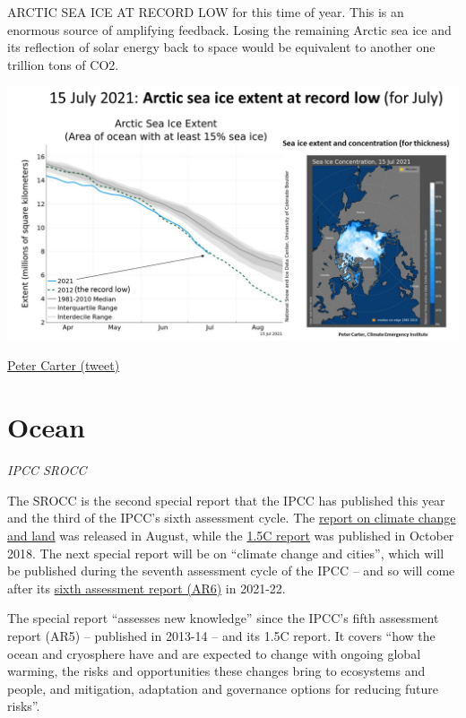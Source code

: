 \documentclass[
]{book}
\begin{document}
ARCTIC SEA ICE AT RECORD LOW for this time of year. This is an enormous source of amplifying feedback. Losing the remaining Arctic sea ice and its reflection of solar energy back to space would be equivalent to another one trillion tons of CO2.

\includegraphics{fig/Arctic_Sea_Ice_2107715.jpeg}

\href{https://twitter.com/PCarterClimate/status/1416264975522295809/photo/1}{Peter Carter (tweet)}

\hypertarget{ocean}{%
\chapter{Ocean}\label{ocean}}

\emph{IPCC SROCC}

The SROCC is the second special report that the IPCC has published this year and the third of the IPCC's sixth assessment cycle. The \href{https://www.carbonbrief.org/in-depth-qa-the-ipccs-special-report-on-climate-change-and-land}{report on climate change and land} was released in August, while the \href{https://www.carbonbrief.org/in-depth-qa-ipccs-special-report-on-climate-change-at-one-point-five-c}{1.5C report} was published in October 2018. The next special report will be on ``climate change and cities'', which will be published during the seventh assessment cycle of the IPCC -- and so will come after its \href{https://www.ipcc.ch/assessment-report/ar6/}{sixth assessment report (AR6)} in 2021-22.

The special report ``assesses new knowledge'' since the IPCC's fifth assessment report (AR5) -- published in 2013-14 -- and its 1.5C report. It covers ``how the ocean and cryosphere have and are expected to change with ongoing global warming, the risks and opportunities these changes bring to ecosystems and people, and mitigation, adaptation and governance options for reducing future risks''.
\end{document}
